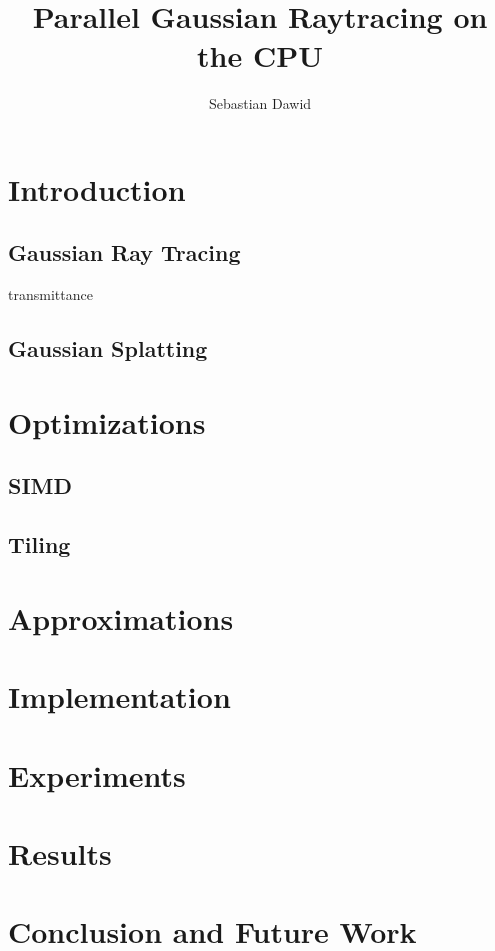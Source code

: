\documentclass[a4paper, 11pt]{memoir}
\title{Parallel Gaussian Raytracing on the CPU}
\author{Sebastian Dawid}
\begin{document}
    \frontmatter
    \smarttitle
    \newpage
    \tableofcontents

    \mainmatter
    \chapter{Introduction}
    \section{Gaussian Ray Tracing}
    \cite{Rhodin:2015}
    \gls{transmittance}
    \section{Gaussian Splatting}
    \cite{kerbl3Dgaussians}
    \chapter{Optimizations}
    \section{SIMD}
    \section{Tiling}
    \chapter{Approximations}
    \cite{fast_exp}
    \cite{AbraSteg72}
    \chapter{Implementation}
    \cite{own_moeller_16_2}
    \chapter{Experiments}
    \chapter{Results}
    \chapter{Conclusion and Future Work}

    \backmatter
    \printglossaries
    \printbibliography[heading=bibintoc]
\end{document}
